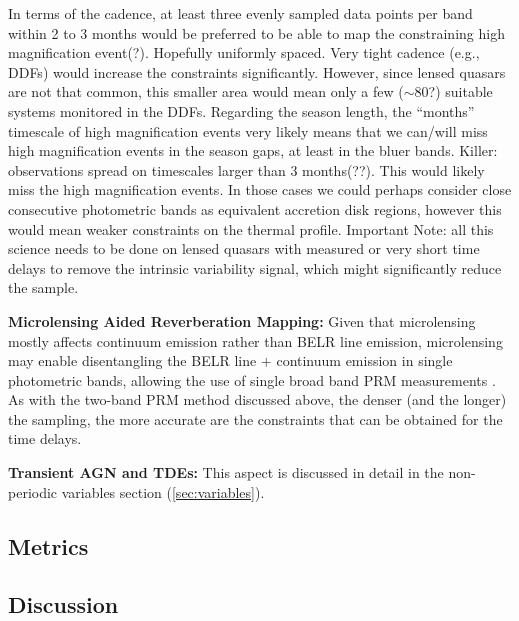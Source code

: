 In terms of the cadence, at least three evenly sampled data points per band within 2 to 3 months would be preferred to be able to map the constraining high magnification event(?). Hopefully uniformly spaced. Very tight cadence (e.g., DDFs) would increase the constraints significantly. However, since lensed quasars are not that common, this smaller area would mean only a few ($\sim80$?) suitable systems monitored in the DDFs.
%
Regarding the season length, the ``months'' timescale of high magnification events very likely means that we can/will miss high magnification events in the season gaps, at least in the bluer bands.
%
Killer: observations spread on timescales larger than 3 months(??). This would likely miss the high magnification events. In those cases we could perhaps consider close consecutive photometric bands as equivalent accretion disk regions, however this would mean weaker constraints on the thermal profile.
%
Important Note: all this science needs to be done on lensed quasars with measured or very short time delays to remove the intrinsic variability signal, which might significantly reduce the sample.

{\bf Microlensing Aided Reverberation Mapping:} Given that microlensing mostly affects continuum emission rather than BELR line emission, microlensing may enable disentangling the BELR line $+$ continuum emission in single photometric bands, allowing the use of single broad band PRM measurements \citep{SluseandTewes2014}. As with the two-band PRM method discussed above, the denser (and the longer) the sampling, the more accurate are the constraints that can be obtained for the time delays.

{\bf Transient AGN and TDEs:} This aspect is discussed in detail in the non-periodic variables section (\autoref{sec:variables}).


\subsection{Metrics}
\label{sec:\secname:metrics}



\subsection{Discussion}
\label{sec:\secname:discussion}


\navigationbar
